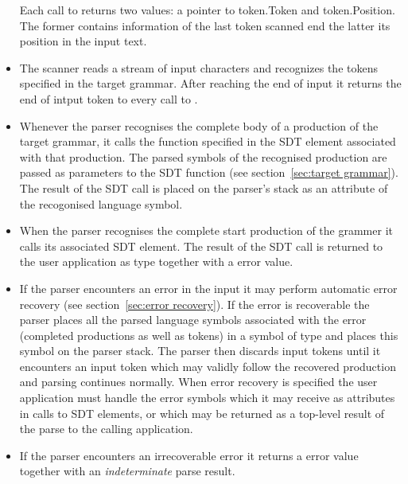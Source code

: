 \documentclass[12pt]{article}
\begin{document}
\begin{itemize}
		Each call to  returns two values: a pointer to token.Token and token.Position. The former contains information of the last token scanned end the latter its position in the input text.

		\item The scanner reads a stream of input characters and recognizes the tokens specified in the target grammar. After reaching the end of input it returns the end of intput token to every call to .

		\item Whenever the parser recognises the complete body of a production of the target grammar, it calls the function specified in the SDT element associated with that production. The parsed symbols of the recognised production are passed as parameters to the SDT function (see section~\ref{sec:target grammar}). The result of the SDT call is placed on the parser's stack as an attribute of the recogonised language symbol.

		\item When the parser recognises the complete start production of the grammer it calls its associated SDT element. The result of the SDT call is returned to the user application as type  together with a  error value.

		\item If the parser encounters an error in the input it may perform automatic error recovery (see section~\ref{sec:error recovery}). If the error is recoverable the parser places all the parsed language symbols associated with the error (completed productions as well as tokens) in a symbol of type  and places this symbol on the parser stack. The parser then discards input tokens until it encounters an input token which may validly follow the recovered production and parsing continues normally. When error recovery is specified the user application must handle the error symbols which it may receive as attributes in calls to SDT elements, or which may be returned as a top-level result of the parse to the calling application.

		\item If the parser encounters an irrecoverable error it returns a  error value together with an {\em indeterminate} parse result.
	\end{itemize}
\end{document}
